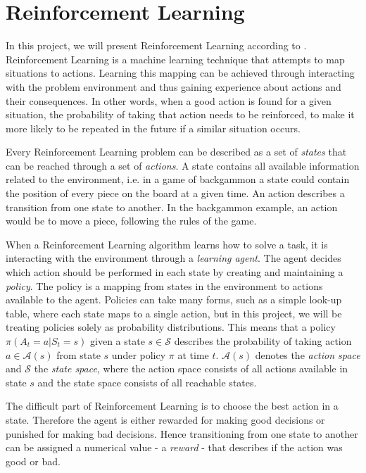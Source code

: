 \documentclass[11pt]{article}
\begin{document}
\maketitle

\section{Reinforcement Learning}

In this project, we will present Reinforcement Learning according to
\cite{RLbook}.
Reinforcement Learning is a machine learning technique that attempts 
to map situations to actions.
Learning this mapping can be achieved through interacting with the problem
environment and thus gaining experience about actions and their consequences.
In other words, when a good action is found for a given situation,
the probability of taking that action needs to be reinforced,
to make it more likely to be
repeated in the future if a similar situation occurs.

Every Reinforcement Learning problem can be described as a set of \textit{states} that can be reached
through a set of \textit{actions}.
A state contains all available information related to the environment,
i.e. in a game of backgammon a state could contain the position of every piece on the board at
a given time.
An action describes a transition from one state to another.
In the backgammon example, an action would be to move a piece, following the rules of the
game.

When a Reinforcement Learning algorithm learns how to solve a task, it is
interacting with the environment through a \textit{learning agent}.
The agent decides which action should be performed in each state by creating and maintaining a \textit{policy}.
The policy is a mapping from states in the environment to actions available to the agent.
Policies can take many forms, such as a simple look-up table, where each state maps to a single
action, but in this project, we will be treating policies solely as probability distributions.
This means that a policy $\pi(A_t = a|S_t = s)$ given a state $s \in \mathcal{S}$ describes the
probability of taking action $a \in \mathcal{A}(s)$ from state $s$ under policy $\pi$ at time $t$.
$\mathcal{A}(s)$ denotes the \textit{action space} and $\mathcal{S}$ the \textit{state space},
where the action space consists of all actions available in state $s$ and the state space consists of
all reachable states.

The difficult part of Reinforcement Learning is to choose the best action in a
state.
Therefore the agent is either rewarded for making good decisions or punished for making bad decisions.
Hence transitioning from one state to another can be assigned a numerical value
- a \textit{reward} - that describes if the action was good or bad.
\end{document}
